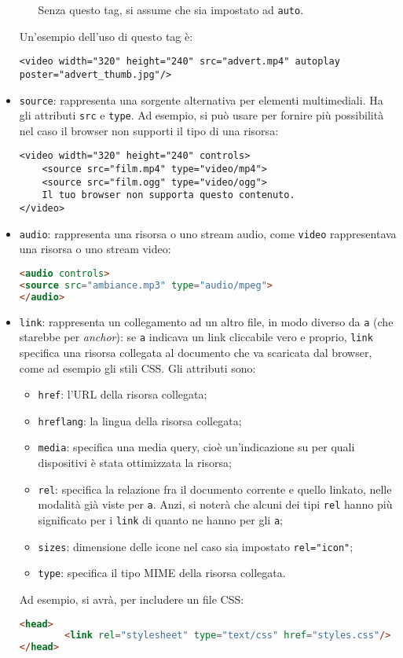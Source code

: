 \documentclass[a4paper,11pt]{article}
\begin{document}
\begin{itemize}
\begin{itemize}
				Senza questo tag, si assume che sia impostato ad \lstinline|auto|.
		\end{itemize}
		Un'esempio dell'uso di questo tag è:
\begin{lstlisting}
<video width="320" height="240" src="advert.mp4" autoplay poster="advert_thumb.jpg"/>
\end{lstlisting}

	\item \lstinline|source|: rappresenta una sorgente alternativa per elementi multimediali.
		Ha gli attributi \lstinline|src| e \lstinline|type|. 
		Ad esempio, si può usare per fornire più possibilità nel caso il browser non supporti il tipo di una risorsa:
\begin{lstlisting}	
<video width="320" height="240" controls>
	<source src="film.mp4" type="video/mp4">
	<source src="film.ogg" type="video/ogg">
	Il tuo browser non supporta questo contenuto.
</video>
\end{lstlisting}

	\item \lstinline|audio|: rappresenta una risorsa o uno stream audio, come \lstinline|video| rappresentava una risorsa o uno stream video:
\begin{lstlisting}[language=html, style=codestyle]	
<audio controls>
<source src="ambiance.mp3" type="audio/mpeg">
</audio>
\end{lstlisting}

\item \lstinline|link|: rappresenta un collegamento ad un altro file, in modo diverso da \lstinline|a| (che starebbe per \textit{anchor}): se \lstinline|a| indicava un link cliccabile vero e proprio, \lstinline|link| specifica una risorsa collegata al documento che va scaricata dal browser, come ad esempio gli stili CSS.
	Gli attributi sono:
	\begin{itemize}
		\item \lstinline|href|: l'URL della risorsa collegata;
		\item \lstinline|hreflang|: la lingua della risorsa collegata;
		\item \lstinline|media|: specifica una media query, cioè un'indicazione su per quali dispositivi è stata ottimizzata la risorsa;
		\item \lstinline|rel|: specifica la relazione fra il documento corrente e quello linkato, nelle modalità già viste per \lstinline|a|. Anzi, si noterà che alcuni dei tipi \lstinline|rel| hanno più significato per i \lstinline|link| di quanto ne hanno per gli \lstinline|a|;
		\item \lstinline|sizes|: dimensione delle icone nel caso sia impostato \lstinline|rel="icon"|;
		\item \lstinline|type|: specifica il tipo MIME della risorsa collegata.
	\end{itemize}
	Ad esempio, si avrà, per includere un file CSS:
\begin{lstlisting}[language=html, style=codestyle]	
<head>
		<link rel="stylesheet" type="text/css" href="styles.css"/>
</head>
\end{lstlisting}
\end{itemize}
\end{document}
